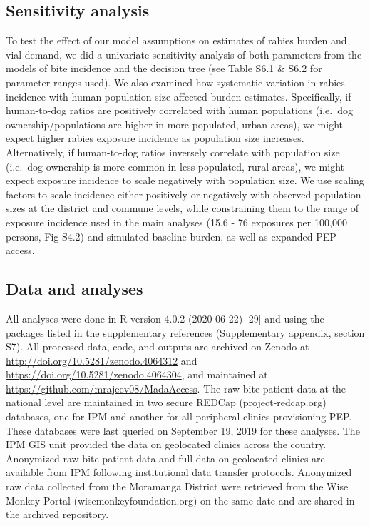 \documentclass[
  oneside]{book}
\begin{document}
\hypertarget{sensitivity-analysis}{%
\subsection{Sensitivity analysis}\label{sensitivity-analysis}}

To test the effect of our model assumptions on estimates of rabies
burden and vial demand, we did a univariate sensitivity analysis of both
parameters from the models of bite incidence and the decision tree (see
Table S6.1 \& S6.2 for parameter ranges used). We also examined how
systematic variation in rabies incidence with human population size
affected burden estimates. Specifically, if human-to-dog ratios are
positively correlated with human populations (i.e.~dog
ownership/populations are higher in more populated, urban areas), we
might expect higher rabies exposure incidence as population size
increases. Alternatively, if human-to-dog ratios inversely correlate
with population size (i.e.~dog ownership is more common in less
populated, rural areas), we might expect exposure incidence to scale
negatively with population size. We use scaling factors to scale
incidence either positively or negatively with observed population sizes
at the district and commune levels, while constraining them to the range
of exposure incidence used in the main analyses (15.6 - 76 exposures per
100,000 persons, Fig S4.2) and simulated baseline burden, as well as
expanded PEP access.

\hypertarget{data-and-analyses-1}{%
\subsection{Data and analyses}\label{data-and-analyses-1}}

All analyses were done in R version 4.0.2 (2020-06-22) {[}29{]} and using
the packages listed in the supplementary references (Supplementary
appendix, section S7). All processed data, code, and outputs are
archived on Zenodo at \url{http://doi.org/10.5281/zenodo.4064312} and
\url{https://doi.org/10.5281/zenodo.4064304}, and maintained at
\url{https://github.com/mrajeev08/MadaAccess}. The raw bite patient data at
the national level are maintained in two secure REDCap
(project-redcap.org) databases, one for IPM and another for all
peripheral clinics provisioning PEP. These databases were last queried
on September 19, 2019 for these analyses. The IPM GIS unit provided the
data on geolocated clinics across the country. Anonymized raw bite
patient data and full data on geolocated clinics are available from IPM
following institutional data transfer protocols. Anonymized raw data
collected from the Moramanga District were retrieved from the Wise
Monkey Portal (wisemonkeyfoundation.org) on the same date and are shared
in the archived repository.
\end{document}
